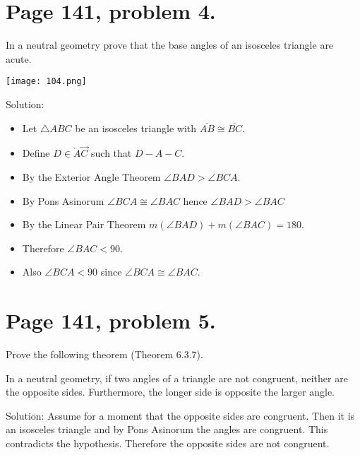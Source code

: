 \documentclass[12pt,openany]{report}
\begin{document}
\newpage

\section*{Page 141, problem 4.}

In a neutral geometry prove that the base angles of an isosceles triangle are acute.

\texttt{[image: 104.png]}

\noindent
Solution:

\begin{itemize}

\item[]
Let $\triangle ABC$ be an isosceles triangle with $\overline{AB}\cong\overline{BC}$.

\item[]
Define $D\in\overleftarrow A\overrightarrow C$ such that $D{-}A{-}C$.

\item[]
By the Exterior Angle Theorem $\angle BAD>\angle BCA$.

\item[]
By Pons Asinorum $\angle BCA\cong\angle BAC$ hence $\angle BAD>\angle BAC$

\item[]
By the Linear Pair Theorem $m(\angle BAD)+m(\angle BAC)=180$.

\item[]
Therefore $\angle BAC<90$.

\item[]
Also $\angle BCA<90$ since $\angle BCA\cong\angle BAC$.

\end{itemize}

\newpage

\section*{Page 141, problem 5.}

Prove the following theorem (Theorem 6.3.7).

\medskip
\noindent
In a neutral geometry, if two angles of a triangle are not congruent,
neither are the opposite sides. Furthermore, the longer side
is opposite the larger angle.

\bigskip
\noindent
Solution: Assume for a moment that the opposite sides are congruent.
Then it is an isosceles triangle and by Pons Asinorum the angles
are congruent. This contradicts the hypothesis.
Therefore the opposite sides are not congruent.
\end{document}
